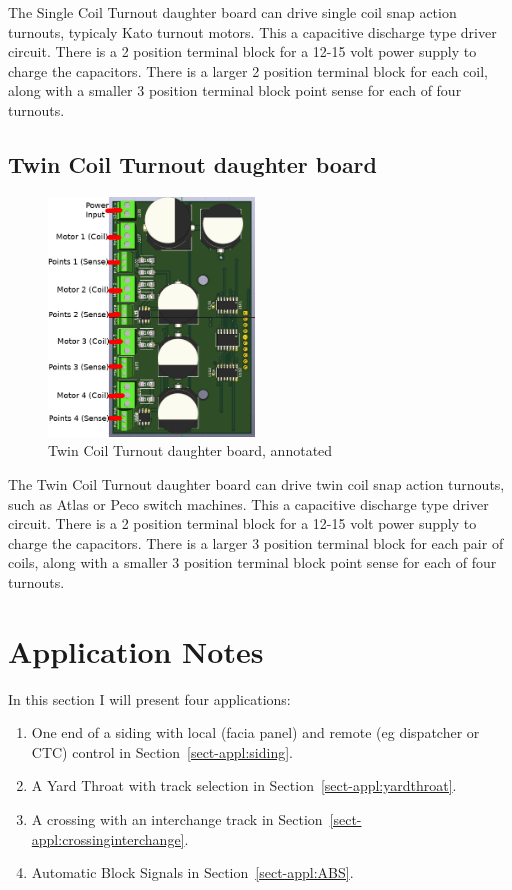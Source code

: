 \documentclass[12pt,twoside]{article}
\begin{document}
The Single Coil Turnout daughter board can drive single coil snap action
turnouts, typicaly Kato turnout motors. This a capacitive discharge type
driver circuit. There is a 2 position terminal block for a 12-15 volt power
supply to charge the capacitors.  There is a larger 2 position terminal block 
for each coil, along with a smaller 3 position terminal block point sense for 
each of four turnouts.

\subsection{Twin Coil Turnout daughter board}
\label{sect:TC-Daughter}
\begin{figure}[hbpt]\begin{centering}%
\includegraphics[height=2.5in]{TC-DaughterBoard-Annotated.png}
\caption{Twin Coil Turnout daughter board, annotated}
\end{centering}\end{figure}                                                    
 
The Twin Coil Turnout daughter board can drive twin coil snap action turnouts,
such as Atlas or Peco switch machines. This a capacitive discharge type driver
circuit. There is a 2 position terminal block for a 12-15 volt power supply to
charge the capacitors. There is a larger 3 position terminal block for each
pair of coils, along with a smaller 3 position terminal block point sense for
each of four turnouts.

\clearpage
\section{Application Notes}

In this section I will present four applications:

\begin{enumerate}
\item One end of a siding with local (facia panel) and remote (eg dispatcher
or CTC) control in Section~\ref{sect-appl:siding}.
\item A Yard Throat with track selection in 
Section~\ref{sect-appl:yardthroat}. 
\item A crossing with an interchange track in 
Section~\ref{sect-appl:crossinginterchange}.
\item Automatic Block Signals in Section~\ref{sect-appl:ABS}.
\end{enumerate}
\end{document}
